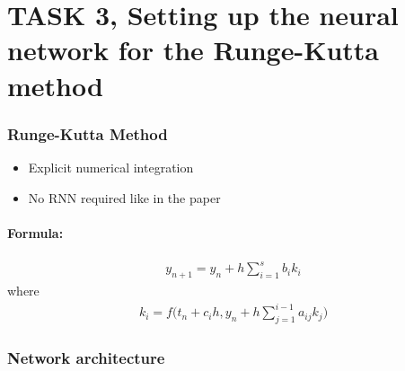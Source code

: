 \section{TASK 3, Setting up the neural network for the Runge-Kutta method}

\begin{frame}
	\frametitle{Runge-Kutta Method}
	\begin{itemize}
		\item Explicit numerical integration
		\item No RNN required like in the paper
	\end{itemize}
	\paragraph{Formula:}
	\begin{align}
		y_{n+1} = y_n + h\sum_{i=1}^s b_i k_i\nonumber
	\end{align}
	where
	\begin{align}
		k_i = f \Bigg( t_n + c_i h, y_n + h\sum_{j=1}^{i-1} a_{ij} k_j\Bigg)\nonumber
	\end{align}

\end{frame}

\begin{frame}
	\frametitle{Network architecture}
\end{frame}
